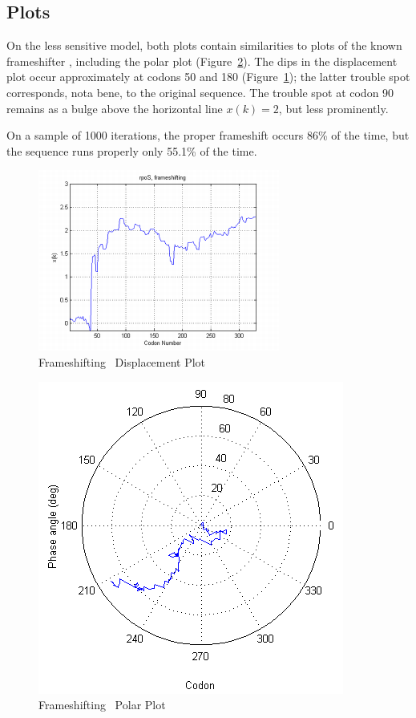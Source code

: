 \documentclass[10pt,twocolumn]{article}
\begin{document}
\subsection{Plots}

On the less sensitive model, both plots contain similarities to plots of the known frameshifter \prfB,
including the polar plot (Figure~\ref{rposfs:polar}).
The dips in the displacement plot occur approximately at codons 50 and 180 (Figure~\ref{rposfs:disp});
the latter trouble spot corresponds, nota bene, to the original sequence.
The trouble spot at codon 90 remains as a bulge above the horizontal line $x(k)=2$,
but less prominently.

On a sample of 1000 iterations, the proper frameshift occurs 86\% of the time,
but the sequence runs properly only 55.1\% of the time.

\begin{figure}[htp]
    \centering
    \caption{Frameshifting \rpoS\ Displacement Plot}
    \label{rposfs:disp}
    \includegraphics{rpoS/frameshift.png}
\end{figure}

\begin{figure}[htp]
    \centering
    \caption{Frameshifting \rpoS\ Polar Plot}
    \label{rposfs:polar}
    \includegraphics[scale=0.7]{rpoS/frameshift-polar.png}
\end{figure}


\end{document}
